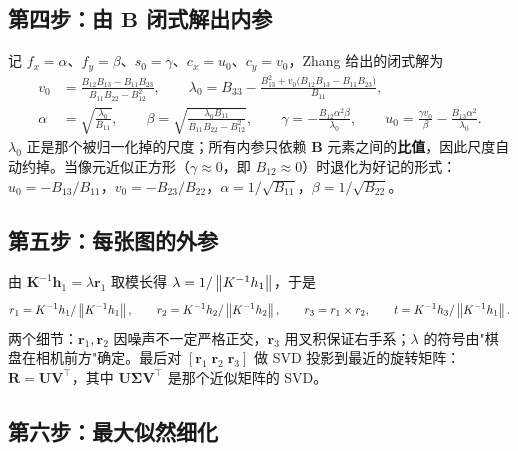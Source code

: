 \subsection{第四步：由 $\bm{B}$ 闭式解出内参}

记 $f_x=\alpha$、$f_y=\beta$、$s_0=\gamma$、$c_x=u_0$、$c_y=v_0$，Zhang 给出的闭式解为
\begin{equation}
\begin{aligned}
v_0 &= \frac{B_{12}B_{13}-B_{11}B_{23}}{B_{11}B_{22}-B_{12}^{2}},\qquad
\lambda_0 = B_{33}-\frac{B_{13}^{2}+v_0\bigl(B_{12}B_{13}-B_{11}B_{23}\bigr)}{B_{11}},\\
\alpha &= \sqrt{\frac{\lambda_0}{B_{11}}},\qquad
\beta = \sqrt{\frac{\lambda_0 B_{11}}{B_{11}B_{22}-B_{12}^{2}}},\qquad
\gamma = -\frac{B_{12}\alpha^{2}\beta}{\lambda_0},\qquad
u_0 = \frac{\gamma v_0}{\beta}-\frac{B_{13}\alpha^{2}}{\lambda_0}.
\end{aligned}
\label{eq:26-intrinsic}
\end{equation}
$\lambda_0$ 正是那个被归一化掉的尺度；所有内参只依赖 $\bm{B}$ 元素之间的\textbf{比值}，因此尺度自动约掉。当像元近似正方形（$\gamma\approx0$，即 $B_{12}\approx0$）时退化为好记的形式：$u_0=-B_{13}/B_{11}$，$v_0=-B_{23}/B_{22}$，$\alpha=1/\sqrt{B_{11}}$，$\beta=1/\sqrt{B_{22}}$。

\subsection{第五步：每张图的外参}

由 $\bm{K}^{-1}\bm{h}_1=\lambda\bm{r}_1$ 取模长得 $\lambda=1/\left\lVert K^{-1}h_1 \right\rVert$，于是
\begin{equation}
r_1=K^{-1}h_1/\left\lVert K^{-1}h_1 \right\rVert,\qquad
r_2=K^{-1}h_2/\left\lVert K^{-1}h_2 \right\rVert,\qquad
r_3=r_1\times r_2,\qquad
t=K^{-1}h_3/\left\lVert K^{-1}h_1 \right\rVert.
\label{eq:26-extrinsic}
\end{equation}
两个细节：$\bm{r}_1,\bm{r}_2$ 因噪声不一定严格正交，$\bm{r}_3$ 用叉积保证右手系；$\lambda$ 的符号由"棋盘在相机前方"确定。最后对 $[\bm{r}_1\;\bm{r}_2\;\bm{r}_3]$ 做 SVD 投影到最近的旋转矩阵：$\bm{R}=\bm{U}\bm{V}^{\top}$，其中 $\bm{U}\bm{\Sigma}\bm{V}^{\top}$ 是那个近似矩阵的 SVD。

\subsection{第六步：最大似然细化}

